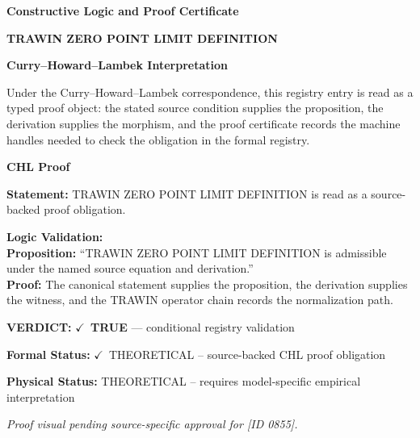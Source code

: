 \clearpage
\begingroup\tzpsupportsetup
\noindent\textbf{\fontsize{10.8pt}{12.8pt}\selectfont [ID 0855] Constructive Logic and Proof Certificate}\par
\noindent\textbf{\fontsize{10pt}{12pt}\selectfont TRAWIN ZERO POINT LIMIT DEFINITION}\par
\vspace{0.45em}
\begingroup
\footnotesize
\setlength{\parskip}{0.22em}
\setlength{\parindent}{0pt}
\noindent\textbf{Curry--Howard--Lambek Interpretation}\par
Under the Curry--Howard--Lambek correspondence, this registry entry is read as a typed proof
object: the stated source condition supplies the proposition, the derivation supplies the
morphism, and the proof certificate records the machine handles needed to check the obligation
in the formal registry.

\vspace{0.45em}
\noindent\textbf{CHL Proof}\par
\textbf{Statement:} TRAWIN ZERO POINT LIMIT DEFINITION is read as a source-backed proof obligation.

\textbf{Logic Validation:}\\
\textbf{Proposition:} ``TRAWIN ZERO POINT LIMIT DEFINITION is admissible under the named source equation and derivation.''\\
\textbf{Proof:} The canonical statement supplies the proposition, the derivation supplies the witness, and the TRAWIN operator chain records the normalization path.

\textbf{VERDICT:} \ensuremath{\checkmark}\ \textbf{TRUE} --- conditional registry validation

\textbf{Formal Status:} \ensuremath{\checkmark}\ THEORETICAL -- source-backed CHL proof obligation

\textbf{Physical Status:} THEORETICAL -- requires model-specific empirical interpretation
\par\vspace{0.45em}
\par
\vfill
\begingroup\footnotesize\itshape
Proof visual pending source-specific approval for [ID 0855].
\par\endgroup
\vfill
\endgroup
\endgroup
